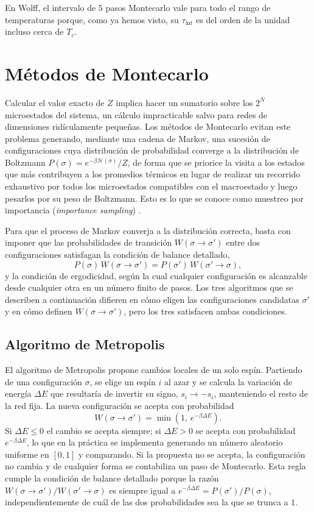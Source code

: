 En Wolff, el intervalo de $5$ pasos Montecarlo vale para todo el rango de temperaturas porque, como ya hemos visto, su $\tau_{\text{int}}$ es del orden de la unidad incluso cerca de $T_c$.

\section{Métodos de Montecarlo} \label{sec:montecarlo}

Calcular el valor exacto de $Z$ implica hacer un sumatorio sobre los $2^N$ microestados del sistema, un cálculo impracticable salvo para redes de dimensiones ridículamente pequeñas. Los métodos de Montecarlo evitan este problema generando, mediante una cadena de Markov, una sucesión de configuraciones cuya distribución de probabilidad converge a la distribución de Boltzmann $P(\sigma)=e^{-\beta\mathcal{H}(\sigma)}/Z$, de forma que se priorice la visita a los estados que más contribuyen a los promedios térmicos en lugar de realizar un recorrido exhaustivo por todos los microestados compatibles con el macroestado y luego pesarlos por su peso de Boltzmann. Esto es lo que se conoce como muestreo por importancia (\textit{importance sampling}) \citep{Metropolis1953,Sokal1997}.

Para que el proceso de Markov converja a la distribución correcta, basta con imponer que las probabilidades de transición $W(\sigma\to\sigma')$ entre dos configuraciones satisfagan la condición de balance detallado,
\[
P(\sigma)\,W(\sigma\to\sigma') = P(\sigma')\,W(\sigma'\to\sigma),
\]
y la condición de ergodicidad, según la cual cualquier configuración es alcanzable desde cualquier otra en un número finito de pasos. Los tres algoritmos que se describen a continuación difieren en cómo eligen las configuraciones candidatas $\sigma'$ y en cómo definen $W(\sigma\to\sigma')$, pero los tres satisfacen ambas condiciones.

\subsection{Algoritmo de Metropolis}

El algoritmo de Metropolis \citep{Metropolis1953} propone cambios locales de un solo espín. Partiendo de una configuración $\sigma$, se elige un espín $i$ al azar y se calcula la variación de energía $\Delta E$ que resultaría de invertir su signo, $s_i \to -s_i$, manteniendo el resto de la red fija. La nueva configuración se acepta con probabilidad
\[
W(\sigma\to\sigma') = \min\left(1,\, e^{-\beta\Delta E}\right).
\]
Si $\Delta E \leq 0$ el cambio se acepta siempre; si $\Delta E > 0$ se acepta con probabilidad $e^{-\beta\Delta E}$, lo que en la práctica se implementa generando un número aleatorio uniforme en $[0,1]$ y comparando. Si la propuesta no se acepta, la configuración no cambia y de cualquier forma se contabiliza un paso de Montecarlo. Esta regla cumple la condición de balance detallado porque la razón $W(\sigma\to\sigma')/W(\sigma'\to\sigma)$ es siempre igual a $e^{-\beta\Delta E} = P(\sigma')/P(\sigma)$, independientemente de cuál de las dos probabilidades sea la que se trunca a $1$.

